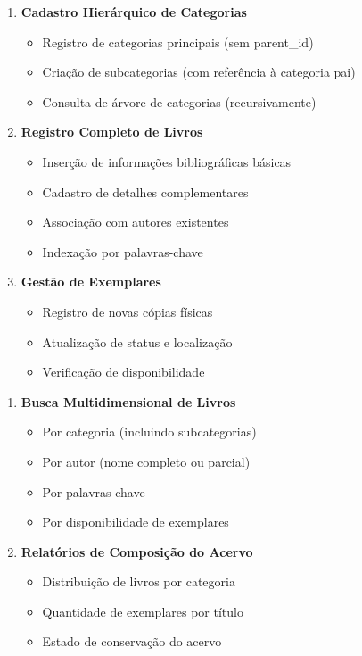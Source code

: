 \documentclass[12pt,a4paper]{article}
\begin{document}
\begin{conceptbox}
\begin{enumerate}[label=\textbf{OA\arabic*.}]
    \item \textbf{Cadastro Hierárquico de Categorias}
    \begin{itemize}
        \item Registro de categorias principais (sem parent\_id)
        \item Criação de subcategorias (com referência à categoria pai)
        \item Consulta de árvore de categorias (recursivamente)
    \end{itemize}

    \item \textbf{Registro Completo de Livros}
    \begin{itemize}
        \item Inserção de informações bibliográficas básicas
        \item Cadastro de detalhes complementares
        \item Associação com autores existentes
        \item Indexação por palavras-chave
    \end{itemize}

    \item \textbf{Gestão de Exemplares}
    \begin{itemize}
        \item Registro de novas cópias físicas
        \item Atualização de status e localização
        \item Verificação de disponibilidade
    \end{itemize}
\end{enumerate}
\end{conceptbox}

\begin{conceptbox}
\begin{enumerate}[label=\textbf{CA\arabic*.}]
    \item \textbf{Busca Multidimensional de Livros}
    \begin{itemize}
        \item Por categoria (incluindo subcategorias)
        \item Por autor (nome completo ou parcial)
        \item Por palavras-chave
        \item Por disponibilidade de exemplares
    \end{itemize}

    \item \textbf{Relatórios de Composição do Acervo}
    \begin{itemize}
        \item Distribuição de livros por categoria
        \item Quantidade de exemplares por título
        \item Estado de conservação do acervo
    \end{itemize}
\end{enumerate}
\end{conceptbox}
\end{document}
